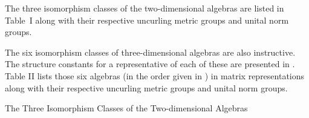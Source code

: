 \documentclass{amsart}
\numberwithin{equation}{section}
\theoremstyle{definition}
\numberwithin{theorem}{section}
\begin{document}
 The three isomorphism classes of the two-dimensional algebras are listed in \mbox{Table I} along with their respective uncurling metric groups and unital norm groups.  
 
 The six isomorphism classes of three-dimensional algebras are also instructive.  The structure constants for a representative of each of these are presented in \cite{kobayashi:2021}.  Table II lists those six algebras (in the order given in \cite{kobayashi:2021}) in matrix representations along with their respective uncurling metric groups and unital norm groups.
 
 \vspace{1cm}
 

  \hspace{1cm} The Three Isomorphism Classes of the Two-dimensional Algebras \enlargethispage{2cm}

\vspace{.5cm}
\end{document}
